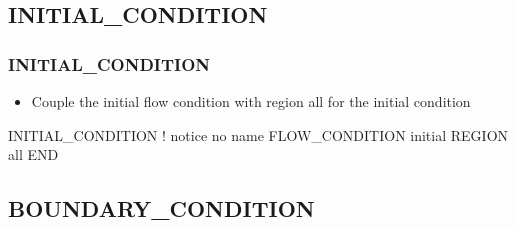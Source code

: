 \documentclass{beamer}
\newcommand\bluecomment[1]{{{\color{blue} #1}}}
\newcommand\greencomment[1]{{{\color{green} #1}}}
\begin{document}
\subsection{INITIAL\_CONDITION}

\begin{frame}[fragile]\frametitle{INITIAL\_CONDITION}

\begin{itemize}
\item Couple the \greencomment{initial} flow condition with region \greencomment{all} for the initial condition
\end{itemize}

\begin{semiverbatim}

INITIAL_CONDITION           \bluecomment{! notice no name}
  FLOW_CONDITION initial
  REGION all
END

\end{semiverbatim}

\end{frame}

\subsection{BOUNDARY\_CONDITION}
\end{document}
